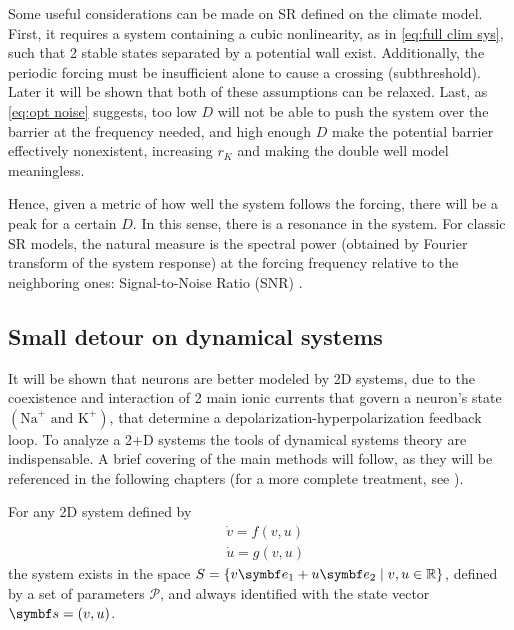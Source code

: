 Some useful considerations can be made on SR defined on the climate model. 
First, it requires a system containing a cubic nonlinearity, as in \ref{eq:full clim sys}, such that 2 stable states separated by a potential wall exist. 
Additionally, the periodic forcing must be insufficient alone to cause a crossing (subthreshold). Later it will be shown that both of these assumptions can be relaxed. 
Last, as \ref{eq:opt noise} suggests, too low $D$ will not be able to push the system over the barrier at the frequency needed, and high enough $D$ make the potential barrier effectively nonexistent, increasing $r_K$ and making the double well model meaningless.

Hence, given a metric of how well the system follows the forcing, there will be a peak for a certain $D$. In this sense, there is a resonance in the system. 
For classic SR models, the natural measure is the spectral power (obtained by Fourier transform of the system response) at the forcing frequency relative to the neighboring ones: Signal-to-Noise Ratio (SNR) \parencite{mcnamaraTheoryStochasticResonance1989}.

\subsection{Small detour on dynamical systems}
\label{sec:dyn-sys}
It will be shown that neurons are better modeled by 2D systems, due to the coexistence and interaction of 2 main ionic currents that govern a neuron's state $\left(\mathrm{Na}^+ \text{ and } \mathrm{K}^+\right)$, that determine a depolarization-hyperpolarization feedback loop.
To analyze a 2+D systems the tools of dynamical systems theory are indispensable. 
A brief covering of the main methods will follow, as they will be referenced in the following chapters (for a more complete treatment, see \parencite{strogatzNonlinearDynamicsChaos2024}).

For any 2D system defined by
\begin{align}
    &\dot{v} = f\left(v, u\right) \\
    &\dot{u} = g\left(v, u\right)
    \label{eq:gensys}
\end{align}
the system exists in the space $S = \left\{v\vb{e}_1+u\vb{e}_2 \;\middle|\; v,u \in \mathbb{R}\right\}$, defined by a set of parameters $\mathcal{P}$, and always identified with the state vector $\vb{s} = \left(v,u\right)$.

